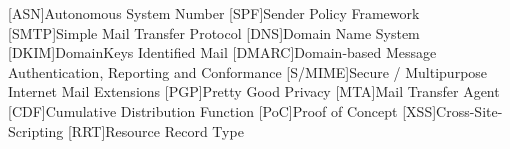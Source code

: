 \begin{acronym}[ECU]
	[ASN]{Autonomous System Number}
	[SPF]{Sender Policy Framework}
	[SMTP]{Simple Mail Transfer Protocol}
	[DNS]{Domain Name System}
	[DKIM]{DomainKeys Identified Mail}
	[DMARC]{Domain-based Message Authentication, Reporting and Conformance}
	[S/MIME]{Secure / Multipurpose Internet Mail Extensions}
	[PGP]{Pretty Good Privacy}
	[MTA]{Mail Transfer Agent}
	[CDF]{Cumulative Distribution Function}
	[PoC]{Proof of Concept}
	[XSS]{Cross-Site-Scripting}
    [RRT]{Resource Record Type}
\end{acronym}
